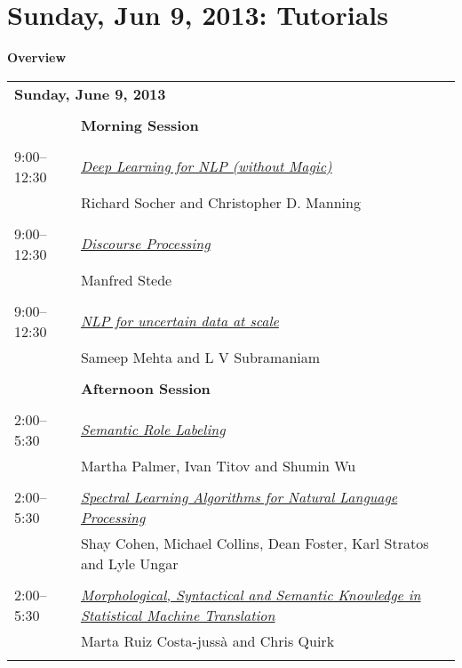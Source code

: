 \chapter{Sunday, Jun 9, 2013: Tutorials}
\thispagestyle{emptyheader}
\vspace{-3em}
\sloppy
\setlength{\parindent}{0in}
\setlength{\parskip}{2ex}
\renewcommand{\baselinestretch}{0.87}

\begin{center}
{\Large \bf
  Overview
}
\end{center}
\vspace{3mm}
\begin{tabular}{p{20mm}p{128mm}}
\multicolumn{2}{l}{\bf Sunday, June 9, 2013} \\
\\
 & {\bf Morning Session} \\
\\
9:00--12:30 & \hyperlink{page.1}{\em Deep Learning for NLP (without Magic)}\\
         & Richard Socher and Christopher D. Manning \\
\\

9:00--12:30 & \hyperlink{page.4}{\em Discourse Processing}\\
         & Manfred Stede \\
\\

9:00--12:30 & \hyperlink{page.7}{\em NLP for uncertain data at scale}\\
         & Sameep Mehta and L V Subramaniam \\
\\

 & {\bf Afternoon Session} \\
\\
2:00--5:30 & \hyperlink{page.10}{\em Semantic Role Labeling}\\
         & Martha Palmer, Ivan Titov and Shumin Wu \\
\\

2:00--5:30 & \hyperlink{page.13}{\em Spectral Learning Algorithms for Natural Language Processing}\\
         & Shay Cohen, Michael Collins, Dean Foster, Karl Stratos and Lyle Ungar \\
\\

2:00--5:30 & \hyperlink{page.16}{\em Morphological, Syntactical and Semantic Knowledge in Statistical Machine Translation}\\
         & Marta Ruiz Costa-juss\`{a} and Chris Quirk \\
\\

\end{tabular}

\clearpage
\clearpage
\clearpage
\clearpage
\clearpage
\clearpage

